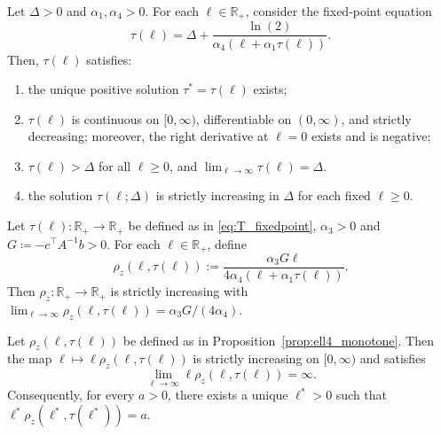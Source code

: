 \documentclass[10pt,a4paper]{amsart}
\begin{document}
\begin{proposition}\label{prop:T_fixedpoint}
    Let $\Delta>0$ and $\alpha_1,\alpha_4>0$. For each $\ell\in\mathbb{R}_+$, consider the fixed-point equation
    \begin{equation}\label{eq:T_fixedpoint}
        \tau(\ell) = \Delta+\frac{\ln(2)}{\alpha_4(\ell+\alpha_1\tau(\ell))}.
    \end{equation}
    Then, $\tau(\ell)$ satisfies:
    \begin{enumerate}
        \item[\emph{(i)}] the unique positive solution $\tau^* = \tau(\ell)$ exists;
        \item[\emph{(ii)}] $\tau(\ell)$ is continuous on $[0,\infty)$, differentiable on $(0,\infty)$, and strictly decreasing; moreover, the right derivative at $\ell=0$ exists and is negative;
        \item[\emph{(iii)}] $\tau(\ell)>\Delta$ for all $\ell\ge0$, and $\lim_{\ell\to\infty}\tau(\ell)=\Delta$.
        \item[\emph{(iv)}] the solution $\tau(\ell;\Delta)$ is strictly increasing in $\Delta$ for each fixed $\ell\ge0$.
    \end{enumerate}
\end{proposition}

\begin{proposition}\label{prop:ell4_monotone}
Let $\tau(\ell):\mathbb{R}_+\to\mathbb{R}_+$ be defined as in 
\eqref{eq:T_fixedpoint}, $\alpha_3>0$ and $G\coloneqq-c^\top A^{-1}b>0$. For each $\ell\in\mathbb{R}_+$, define
\begin{equation*}
    \rho_z(\ell,\tau(\ell))
    := \frac{\alpha_3 G\ell}{4\alpha_4(\ell+\alpha_1\tau(\ell))}.
\end{equation*}
Then $\rho_z:\mathbb{R}_+\to\mathbb{R}_+$ is strictly increasing with 
$\lim_{\ell\to\infty}\rho_z(\ell,\tau(\ell))=\alpha_3G/(4\alpha_4)$.
\end{proposition}

\begin{proposition}\label{prop:Lell4_threshold}
Let $\rho_z(\ell,\tau(\ell))$ be defined as in Proposition~\ref{prop:ell4_monotone}. Then the map 
$\ell\mapsto \ell\rho_z(\ell,\tau(\ell))$ is strictly increasing 
on $[0,\infty)$ and satisfies
\begin{equation*}
    \lim_{\ell\to\infty}\ell\rho_z(\ell,\tau(\ell))=\infty.
\end{equation*}
Consequently, for every $a>0$, there exists a unique $\ell^*>0$ such that 
$\ell^*\rho_z(\ell^*,\tau(\ell^*))=a$.
\end{proposition}
\end{document}
